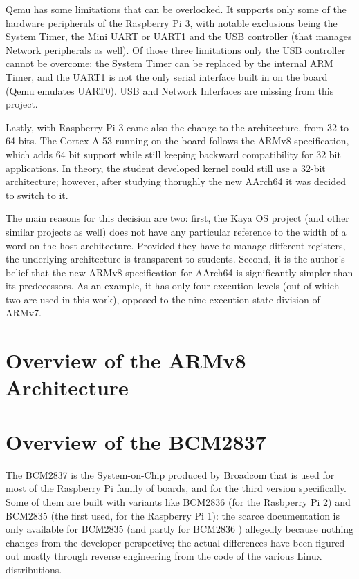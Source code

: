\documentclass[12pt,a4paper,openright,twoside]{report}
\begin{document}
Qemu has some limitations that can be overlooked. It supports only some of the
hardware peripherals of the Raspberry Pi 3, with notable exclusions being the
System Timer, the Mini UART or UART1 and the USB controller 
(that manages Network peripherals as well).
Of those three limitations only the USB controller cannot be overcome: the 
System Timer can be replaced by the internal ARM Timer, and the UART1 is not
the only serial interface built in on the board (Qemu emulates UART0).
USB and Network Interfaces are missing from this project.

Lastly, with Raspberry Pi 3 came also the change to the architecture, from 32 
to 64 bits. The Cortex A-53 running on the board follows the ARMv8 specification,
which adds 64 bit support while still keeping backward compatibility for 32 bit
applications. In theory, the student developed kernel could still use a 32-bit
architecture; however, after studying thorughly the new AArch64 it was decided
to switch to it.

The main reasons for this decision are two: first, the Kaya OS project (and
other similar projects as well) does not have any particular reference to the
width of a word on the host architecture. Provided they have to manage different
registers, the underlying architecture is transparent to students.
Second, it is the author's belief that the new ARMv8 specification for AArch64
is significantly simpler than its predecessors. As an example, it has only four execution
levels (out of which two are used in this work), opposed to the nine execution-state 
division of ARMv7.

\clearpage{\pagestyle{empty}\cleardoublepage}
\chapter{Overview of the ARMv8 Architecture}

\clearpage{\pagestyle{empty}\cleardoublepage}
\chapter{Overview of the BCM2837}
The BCM2837 is the System-on-Chip produced by Broadcom that is used for most
of the Raspberry Pi family of boards, and for the third version specifically.
 Some of them are built with variants like BCM2836 (for the Rasbperry Pi 2)
  and BCM2835 (the first used, for the Raspberry Pi 1): the scarce documentation
  is only available for BCM2835 \cite{bcm2835} (and partly for BCM2836 \cite{rev3.4})
  allegedly because nothing changes from the developer perspective; the actual 
  differences have been figured out mostly through reverse engineering from the 
  code of the various Linux distributions.
\end{document}
